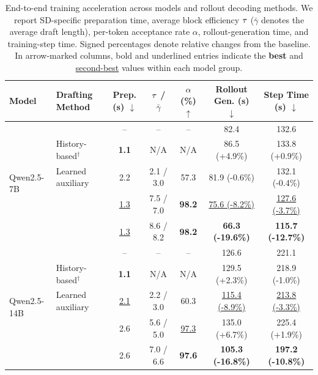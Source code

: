 \begin{table}[t]
\centering
\footnotesize
\setlength{\tabcolsep}{3.6pt}
\renewcommand{\arraystretch}{1.08}
\caption{
End-to-end training acceleration across models and rollout decoding methods.
We report SD-specific preparation time, average block efficiency $\tau$ ($\bar{\gamma}$ denotes the average draft length), per-token acceptance rate $\alpha$, rollout-generation time, and training-step time.
Signed percentages denote relative changes from the \nosd{} baseline.
In arrow-marked columns, bold and underlined entries indicate the \textbf{best} and \underline{second-best} values within each model group.
}
\label{tab:e2e_speedup}
\begin{tabular}{llccccc}
\toprule
\textbf{Model}
&
\textbf{Drafting Method}
&
\textbf{Prep. (s) $\downarrow$}
&
\textbf{$\tau$ / $\bar{\gamma}$}
&
\textbf{$\alpha$ (\%) $\uparrow$}
&
\textbf{Rollout Gen. (s) $\downarrow$}
&
\textbf{Step Time (s) $\downarrow$} \\
\midrule

\multirow{5}{*}{Qwen2.5-7B}
& \nosd{}
& --
& --
& --
& 82.4
& 132.6 \\
& History-based$^\dagger$
& \textbf{1.1}
& N/A
& N/A
& 86.5 (+4.9\%)
& 133.8 (+0.9\%) \\
& Learned auxiliary
& 2.2
& 2.1 / 3.0
& 57.3
& 81.9 (-0.6\%)
& 132.1 (-0.4\%) \\
& \Alwayssd{}
& \underline{1.3}
& 7.5 / 7.0
& \textbf{98.2}
& \underline{75.6 (-8.2\%)}
& \underline{127.6 (-3.7\%)} \\
\rowcolor{gray!10}
\cellcolor{white}
& \methodtitle{}
& \underline{1.3}
& 8.6 / 8.2
& \textbf{98.2}
& \textbf{66.3 (-19.6\%)}
& \textbf{115.7 (-12.7\%)} \\

\midrule

\multirow{5}{*}{Qwen2.5-14B}
& \nosd{}
& --
& --
& --
& 126.6
& 221.1 \\
& History-based$^\dagger$
& \textbf{1.1}
& N/A
& N/A
& 129.5 (+2.3\%)
& 218.9 (-1.0\%) \\
& Learned auxiliary
& \underline{2.1}
& 2.2 / 3.0
& 60.3
& \underline{115.4 (-8.9\%)}
& \underline{213.8 (-3.3\%)} \\
& \Alwayssd{}
& 2.6
& 5.6 / 5.0
& \underline{97.3}
& 135.0 (+6.7\%)
& 225.4 (+1.9\%) \\
\rowcolor{gray!10}
\cellcolor{white}
& \methodtitle{}
& 2.6
& 7.0 / 6.6
& \textbf{97.6}
& \textbf{105.3 (-16.8\%)}
& \textbf{197.2 (-10.8\%)} \\


\end{tabular}
\end{table}
